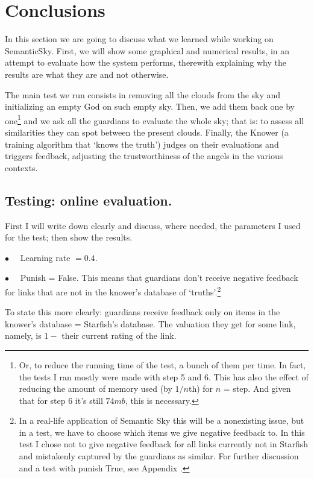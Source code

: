 \documentclass[11pt]{article}
\begin{document}
\section{Conclusions}

In this section we are going to discuss what we learned while working on SemanticSky.
First, we will show some graphical and numerical results, in an attempt to evaluate how the system performs, therewith explaining why the results are what they are and not otherwise.

The main test we run consists in removing all the clouds from the sky and initializing an empty God on such empty sky. Then, we add them back one by one\footnote{Or, to reduce the running time of the test, a bunch of them per time. In fact, the tests I ran mostly were made with step 5 and 6. This has also the effect of reducing the amount of memory used (by $1/n$th) for $n$ = step. And given that for step 6 it's still $74mb$, this is necessary.} and we ask all the guardians to evaluate the whole sky; that is: to assess all similarities they can spot between the present clouds. 
Finally, the Knower (a training algorithm that `knows the truth') judges on their evaluations and triggers feedback, adjusting the trustworthiness of the angels in the various contexts.

\subsection{Testing: online evaluation.}

First I will write down clearly and discuss, where needed, the parameters I used for the test; then show the results.

$\bullet \quad$ Learning rate $= 0.4$.

$\bullet \quad$ Punish = False. This means that guardians don't receive negative feedback for links that are not in the knower's database of `truths'.\footnote{In a real-life application of Semantic Sky this will be a nonexisting issue, but in a test, we have to choose which items we give negative feedback to. In this test I chose not to give negative feedback for all links currently not in Starfish and mistakenly captured by the guardians as similar. For further discussion and a test with punish True, see Appendix .}

To state this more clearly: guardians receive feedback only on items in the knower's database = Starfish's database. The valuation they get for some link, namely, is $1 - $ their current rating of the link.
\end{document}
